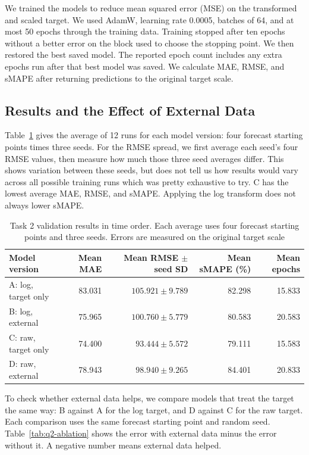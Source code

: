 \documentclass[11pt,a4paper]{article}
\begin{document}
We trained the models to reduce mean squared error (MSE) on the transformed
and scaled target. We used AdamW, learning rate 0.0005, batches of 64, and at
most 50 epochs through the training data. Training stopped after ten
epochs without a better error on the block used to choose the stopping point.
We then restored the best saved model. The reported epoch count includes any
extra epochs run after that best model was saved. We calculate MAE, RMSE, and
sMAPE after returning predictions to the original target scale. 

\subsection*{Results and the Effect of External Data}

Table~\ref{tab:q2-results} gives the average of 12 runs for each model version:
four forecast starting points times three seeds. For the RMSE spread, we first
average each seed's four RMSE values, then measure how much those three seed
averages differ. This shows variation between these seeds, but does not tell
us how results would vary across all possible training runs which was pretty exhaustive to try.
C has the lowest average MAE, RMSE, and sMAPE. Applying the log transform does not always
lower sMAPE.

\begin{table}[ht]
\centering
\small
\setlength{\tabcolsep}{6pt}
\begin{tabular}{lrrrr}
\hline
Model version & Mean MAE & Mean RMSE $\pm$ seed SD & Mean sMAPE (\%) &
Mean epochs \\
\hline
A: log, target only & 83.031 & $105.921\pm9.789$ & 82.298 & 15.833 \\
B: log, external & 75.965 & $100.760\pm5.779$ & 80.583 & 20.583 \\
C: raw, target only & 74.400 & $93.444\pm5.572$ & 79.111 & 15.583 \\
D: raw, external & 78.943 & $98.940\pm9.265$ & 84.401 & 20.833 \\
\hline
\end{tabular}
\caption{Task 2 validation results in time order. Each average uses four
forecast starting points and three seeds. Errors are
measured on the original target scale}
\label{tab:q2-results}
\end{table}

To check whether external data helps, we compare models that treat the target
the same way: B against A for the log target, and D against C for the raw
target. Each comparison uses the same forecast starting point and random
seed. Table~\ref{tab:q2-ablation} shows the error with external data minus
the error without it. A negative number means external data helped.
\end{document}
